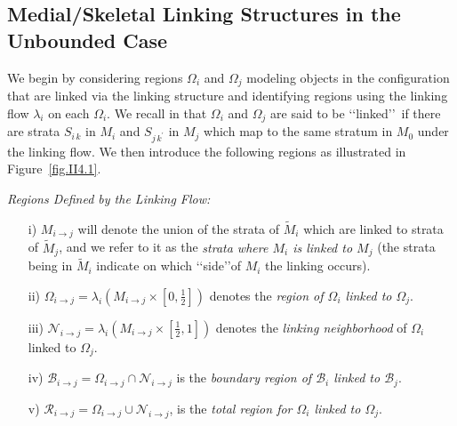 \documentclass[10pt]{amsart}
\theoremstyle{definition}
\theoremstyle{definition}
\numberwithin{equation}{section}
\newcommand{\flushpar}{\par \noindent}
\def \cB {\mathcal{B}}
\def \cN {\mathcal{N}}
\def \cR {\mathcal{R}}
\def \gl {\lambda}
\def \gW {\Omega}
\begin{document}
\subsection*{Medial/Skeletal Linking Structures in the Unbounded Case}  
\par 
We begin by considering regions $\gW_i$ and $\gW_j$ modeling objects in 
the configuration that are linked via the linking structure and 
identifying regions using the linking flow $\gl_{i}$ on each $\gW_i$.  We 
recall in \cite{DG1} that $\gW_i$ and $\gW_j$ are said to be 
\lq\lq linked\rq\rq\, if there are strata $S_{i\, k}$ in $M_i$ and $S_{j\, 
k^{\prime}}$ in $M_j$ which map to the 
same stratum in $M_0$ under the linking flow.  We then introduce the 
following regions as illustrated in Figure~\ref{fig.II4.1}. \par
\vspace{2ex}
\flushpar
{\it Regions Defined by the Linking Flow:} \par
\vspace{1ex}
\begin{itemize}
\item[i)] $M_{i \to j}$ will denote the union of the strata of $\tilde M_i$ 
which are linked to strata of $\tilde M_j$, and we refer to it as the {\it 
strata where $M_i$ is linked to $M_j$} (the strata being in $\tilde M_i$ 
indicate on which \lq\lq side\rq\rq of $M_i$ the linking occurs).  
\item[ii)] $\gW_{i\to j} = \gl_{i}(M_{i\to j} \times \left[0, 
\frac{1}{2}\right])$ denotes the {\it region of $\gW_i$ linked to $\gW_j$}.   
\item[iii)]  $\cN_{i\to j} = \gl_{i}(M_{i\to j} \times \left[\frac{1}{2}, 
1\right])$ denotes the {\it linking neighborhood} of $\gW_i$ linked to 
$\gW_j$.  
\item[iv)]  $\cB_{i \to j} = \gW_{i \to j} \cap \cN_{i \to j}$ is the {\it 
boundary region of $\cB_i$ linked to $\cB_j$}. 
\item[v)]  $\cR_{i \to j} = \gW_{i \to j} \cup \cN_{i \to j}$, is the {\it 
total region for $\gW_i$ linked to $\gW_j$}.
\end{itemize} 
\par 
\end{document}

